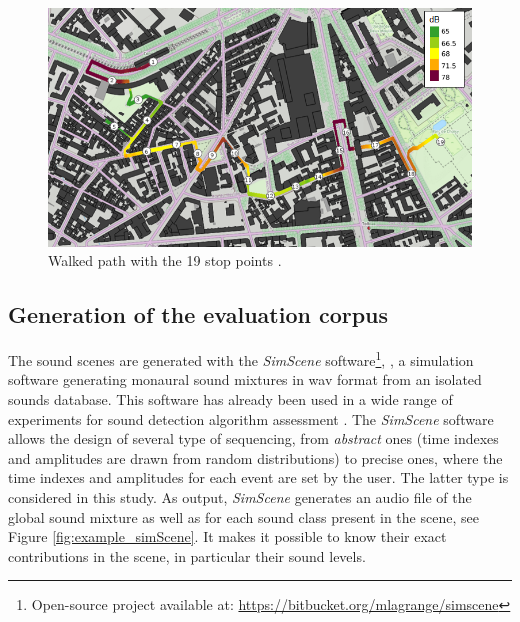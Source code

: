 \documentclass[review,5p,twocolumn,sort&compress,times]{elsarticle}
\begin{document}
\begin{figure}[t]
\centering
\includegraphics[width=\linewidth]{./figures/trajet_19pts.png}
\caption{Walked path with the 19 stop points  \cite{aumond_modelling_2017}.}
\label{fig:map_grafic}
\end{figure}


\subsection{Generation of the evaluation corpus}\label{part:simScene}
The sound scenes are generated with the \textit{SimScene} software\footnote{Open-source project available at: \url{https://bitbucket.org/mlagrange/simscene}}, \cite{rossignol_simscene:_2015}, a simulation software generating monaural sound mixtures in wav format from an isolated sounds database.
This software has already been used in a wide range of experiments for sound detection algorithm assessment \cite{lafay_new_2014, benetos2016detection}. The \textit{SimScene} software allows the design of several type of sequencing, from \textit{abstract} ones (time indexes and amplitudes are drawn from random distributions) to  precise ones, where the time indexes and amplitudes for each event are set by the user. The latter type is considered in this study. As output, \textit{SimScene} generates an audio file of the global sound mixture as well as for each sound class present in the scene, see Figure \ref{fig:example_simScene}. It makes it possible to know their exact contributions in the scene, in particular their sound levels.
\end{document}
